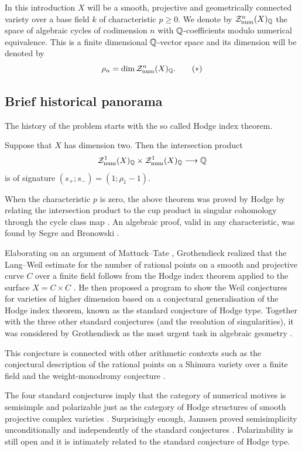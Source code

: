 \documentclass[11pt]{amsart}
\begin{document}
In this introduction $X$ will be a smooth, projective and geometrically connected variety over a base field $k$ of characteristic $p\geq 0$. We denote by  $\mathcal{Z}_{\mathrm{num}}^n(X)_{\mathbb{Q}}$ the space of algebraic cycles of codimension $n$ with $\mathbb{Q}$-coefficients modulo numerical equivalence. This is a finite dimensional {$\mathbb{Q}$-vector} space and its dimension will be denoted by
\begin{equation} \label{eq:intro}
\rho_n=\dim \mathcal{Z}_{\mathrm{num}}^n(X)_{\mathbb{Q}}. \tag{$*$}
\end{equation}

\subsection*{Brief historical panorama}
The history of the problem starts with the so called Hodge index  theorem.
\begin{theorem}\label{introsegre}
Suppose that $X$ has dimension two. Then the intersection product  
\[\mathcal{Z}^1_{\mathrm{num}}(X)_{\mathbb{Q}}\times \mathcal{Z}_{\mathrm{num}}^1(X)_{\mathbb{Q}} \longrightarrow \mathbb{Q}\]
is of signature $(s_+ ; s_-)=(1; \rho_1 - 1)$.
\end{theorem}
When the characteristic $p$ is zero, the above theorem was proved by Hodge by relating  the intersection product to the cup product in singular cohomology through the cycle class map \cite{Hodge}. An algebraic proof, valid in any characteristic,  was found by Segre \cite{Segre} and Bronowski \cite{Brono}.

Elaborating on an argument of Mattuck--Tate \cite {Mattuck}, Grothendieck  realized that the Lang--Weil estimate for the number of rational points on a smooth and projective curve $C$ over a finite field follows from the Hodge index theorem applied to the surface $X=C\times C$ \cite{Grothseg}. He then proposed a program to show the Weil conjectures for varieties of higher dimension based on a conjectural generalisation of the Hodge index theorem,  known as the standard conjecture of Hodge type. Together with the three other standard conjectures (and the resolution of singularities), it was considered by Grothendieck as the most urgent task in algebraic geometry \cite{GrothSC}. 

This conjecture is connected with other arithmetic contexts such as the conjectural description of the rational points on a Shimura variety over a finite field \cite{LRSC} and the weight-monodromy conjecture \cite{mSaito}. 

The four standard conjectures imply that the category of numerical motives   is semisimple and polarizable just as the category of Hodge structures of smooth projective complex varieties \cite{Rivano}. Surprisingly enough, Jannsen proved semisimplicity   unconditionally and independently of the standard conjectures \cite{Jann}. Polarizability is still open and it is intimately related to the standard conjecture of Hodge type.
\end{document}
